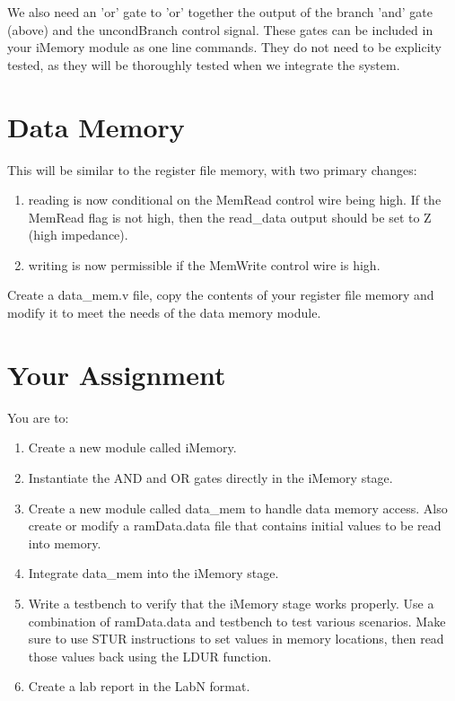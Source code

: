 We also need an 'or' gate to 'or' together the output of the branch 'and' gate (above) and the uncondBranch control signal.  These gates can be included in your iMemory module as one line commands.  They do not need to be explicity tested, as they will be thoroughly tested when we integrate the system.  

\section{Data Memory}

This will be similar to the register file memory, with two primary changes:
\begin{enumerate}
\item reading is now conditional on the MemRead control wire being high.  If the MemRead flag is not high, then the read\_data output should be set to Z (high impedance).
\item writing is now permissible if the MemWrite control wire is high.
\end{enumerate}
Create a data\_mem.v file, copy the contents of your register file memory and modify it to meet the needs of the data memory module.

\section{Your Assignment}

You are to:
\begin{enumerate}
\item Create a new module called iMemory.
\item Instantiate the AND and OR gates directly in the iMemory stage.
\item Create a new module called data\_mem to handle data memory access.  Also create or modify a ramData.data file that contains initial values to be read into memory.
\item Integrate data\_mem into the iMemory stage.  
\item Write a testbench to verify that the iMemory stage works properly. Use a combination of ramData.data and testbench to test various scenarios.  Make sure to use STUR instructions to set values in memory locations, then read those values back using the LDUR function. 
\item Create a lab report in the LabN format.
\end{enumerate} 